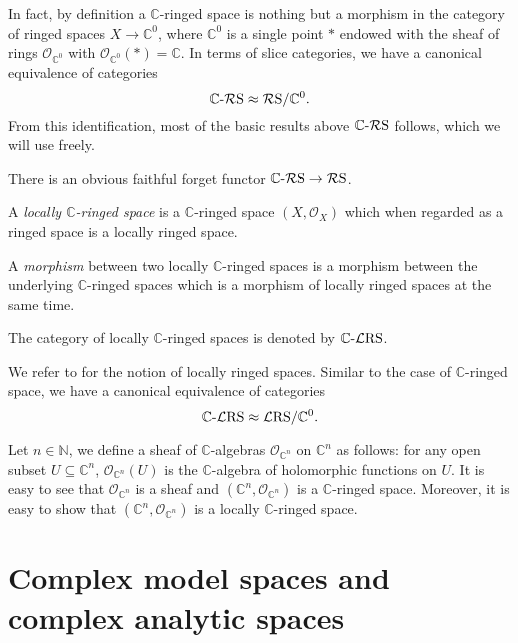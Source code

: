 In fact, by definition a $\mathbb{C}$-ringed space is nothing but a morphism in the category of ringed spaces $X\rightarrow \mathbb{C}^0$, where $\mathbb{C}^0$ is a single point $*$ endowed with the sheaf of rings $\mathcal{O}_{\mathbb{C}^0}$ with $\mathcal{O}_{\mathbb{C}^0}(*)=\mathbb{C}$. In terms of slice categories, we have a canonical equivalence of categories 
\[
    \mathbb{C}\text{-}\mathcal{R}\mathrm{S}\approx\mathcal{R}\mathrm{S}/\mathbb{C}^0. 
\]
From this identification, most of the basic results above $\mathbb{C}\text{-}\mathcal{R}\mathrm{S}$ follows, which we will use freely.

There is an obvious faithful forget functor $\mathbb{C}\text{-}\mathcal{R}\mathrm{S}\rightarrow \mathcal{R}\mathrm{S}$.


\begin{definition}
    A \emph{locally $\mathbb{C}$-ringed space} is a $\mathbb{C}$-ringed space $(X,\mathcal{O}_X)$ which when regarded as a ringed space is a locally ringed space.

    A \emph{morphism} between two locally $\mathbb{C}$-ringed spaces is a morphism between the underlying $\mathbb{C}$-ringed spaces which is a morphism of locally ringed spaces at the same time.

    The category of locally $\mathbb{C}$-ringed spaces is denoted by $\mathbb{C}\text{-}\mathcal{L}\mathrm{RS}$.
\end{definition}
We refer to \cite[\href{https://stacks.math.columbia.edu/tag/01HA}{Tag 01HA}]{stacks-project} for the notion of locally ringed spaces. Similar to the case of $\mathbb{C}$-ringed space, we have a canonical equivalence of categories
\[
    \mathbb{C}\text{-}\mathcal{L}\mathrm{RS}\approx\mathcal{L}\mathrm{RS}/\mathbb{C}^0. 
\]

\begin{example}\label{ex-Cnringed}
    Let $n\in \mathbb{N}$, we define a sheaf of $\mathbb{C}$-algebras $\mathcal{O}_{\mathbb{C}^n}$ on $\mathbb{C}^n$ as follows: for any open subset $U\subseteq \mathbb{C}^n$, $\mathcal{O}_{\mathbb{C}^n}(U)$ is the $\mathbb{C}$-algebra of holomorphic functions on $U$. It is easy to see that $\mathcal{O}_{\mathbb{C}^n}$ is a sheaf and $(\mathbb{C}^n,\mathcal{O}_{\mathbb{C}^n})$ is a $\mathbb{C}$-ringed space. Moreover, it is easy to show that $(\mathbb{C}^n,\mathcal{O}_{\mathbb{C}^n})$ is a locally $\mathbb{C}$-ringed space.
\end{example}

\section{Complex model spaces and complex analytic spaces}



